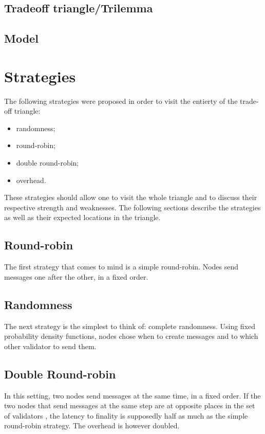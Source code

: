 \subsection{Tradeoff triangle/Trilemma}

\subsection{Model}

\section{Strategies}
The following strategies were proposed in order to visit the entierty of the
trade-off triangle:
\begin{itemize}
        \item randomness;
        \item round-robin;
        \item double round-robin;
        \item overhead.
\end{itemize}
These strategies should allow one to visit the whole triangle and to discuss
their respective strength and weaknesses. The following sections describe the
strategies as well as their expected locations in the triangle.

\subsection{Round-robin}
The first strategy that comes to mind is a simple round-robin. Nodes send
messages one after the other, in a fixed order.

\subsection{Randomness}
The next strategy is the simplest to think of: complete randomness. Using fixed
probability density functions, nodes chose when to create messages and to which
other validator to send them.

\subsection{Double Round-robin}
In this setting, two nodes send messages at the same time, in a fixed order. If
the two nodes that send messages at the same step are at opposite places in the
set of validators , the latency to finality is supposedly
half as much as the simple round-robin strategy. The overhead is however
doubled.

